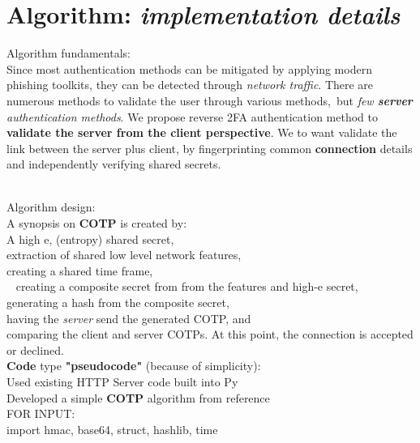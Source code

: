 \documentclass[a4paper, 11pt]{article} 				%
\begin{document}
\section{Algorithm: \textit{implementation details}}
\noindent
Algorithm fundamentals:\\
Since most authentication methods can be mitigated by applying modern phishing toolkits,
they can be detected through \textit{network traffic}.
There are numerous methods to validate the user through various methods, but \textit{few \textbf{server} authentication methods}.
We propose reverse 2FA authentication method to \textbf{validate the server from the client perspective}.
We to want validate the link between the server plus client, by fingerprinting common \textbf{connection} details and independently verifying shared secrets.\\ 

\noindent
Algorithm design:\\
A synopsis on \textbf{COTP} is created by:\\
\noindent
A high e, (entropy) shared secret,\\
extraction of shared low level network features,\\
creating a shared time frame,\\ 
creating a composite secret from from the features and high-e secret,\\
generating a hash from the composite secret,\\
having the \textit{server} send the generated COTP, and\\
comparing the client and server COTPs. At this point, the connection is accepted or declined.\\

\noindent
\textbf{Code} type \textbf{"pseudocode"} (because of simplicity):\\
\noindent
Used existing HTTP Server code built into Py\\
\noindent
Developed a simple \textbf{COTP} algorithm from reference\\

\noindent
FOR INPUT:\\
\noindent
import hmac, base64, struct, hashlib, time\\
\end{document}
